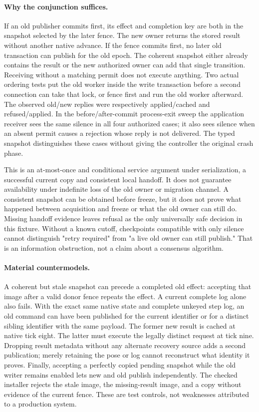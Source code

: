 \documentclass{article}
\begin{document}
\paragraph{Why the conjunction suffices.}
If an old publisher commits first, its effect and completion key
are both in the snapshot selected by the later fence. The new
owner returns the stored result without another native advance.
If the fence commits first, no later old transaction can
publish for the old epoch. The coherent snapshot either already
contains the result or the new authorized owner can add that
single transition. Receiving without a matching permit does not
execute anything. Two actual ordering tests put the old worker
inside the write transaction before a second connection can
take that lock, or fence first and run the old worker afterward.
The observed old/new replies were respectively applied/cached
and refused/applied. In the before/after-commit process-exit
sweep the application receiver sees the same silence in all
four authorized cases; it also sees silence when an absent
permit causes a rejection whose reply is not delivered. The
typed snapshot distinguishes these cases without giving the
controller the original crash phase.

This is an at-most-once and conditional service argument under
serialization, a successful current copy and consistent local
handoff. It does not guarantee availability under indefinite
loss of the old owner or migration channel. A consistent
snapshot can be obtained before freeze, but it does not prove
what happened between acquisition and freeze or what the old
owner can still do. Missing handoff evidence leaves refusal as
the only universally safe decision in this fixture. Without a
known cutoff, checkpoints compatible with only silence cannot
distinguish "retry required" from "a live old owner can still
publish." That is an information obstruction, not a claim
about a consensus algorithm.

\paragraph{Material countermodels.}
A coherent but stale snapshot can precede a completed old
effect: accepting that image after a valid donor fence repeats
the effect. A current complete log alone also fails. With the
exact same native state and complete unkeyed step log, an old
command can have been published for the current identifier or
for a distinct sibling identifier with the same payload.
The former new result is cached at native tick eight. The
latter must execute the legally distinct request at tick nine.
Dropping result metadata without any alternate recovery source
adds a second publication; merely retaining the pose or log
cannot reconstruct what identity it proves. Finally, accepting a
perfectly copied pending snapshot while the old writer remains
enabled lets new and old publish independently. The checked
installer rejects the stale image, the missing-result image,
and a copy without evidence of the current fence. These are
test controls, not weaknesses attributed to a production system.
\end{document}
